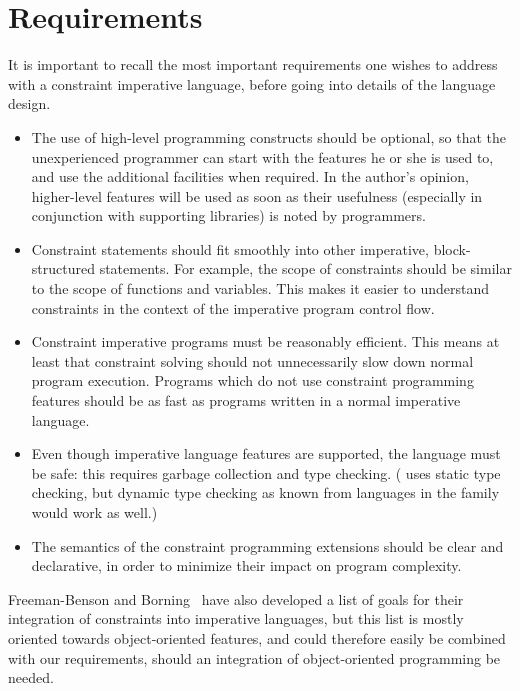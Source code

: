 \section{Requirements}
\label{sec:requirements}

It is important to recall the most important requirements one wishes
to address with a constraint imperative language, before going into
details of the language design.
%
\begin{itemize}
\item The use of high-level programming constructs should be optional,
  so that the unexperienced programmer can start with the features he
  or she is used to, and use the additional facilities when required.
  In the author's opinion, higher-level features will be used as soon
  as their usefulness (especially in conjunction with supporting
  libraries) is noted by programmers.

\item Constraint statements should fit smoothly into other imperative,
  block-structured statements.  For example, the scope of constraints
  should be similar to the scope of functions and variables.  This
  makes it easier to understand constraints in the context of the
  imperative program control flow.
  
\item Constraint imperative programs must be reasonably efficient.
  This means at least that constraint solving should not unnecessarily
  slow down normal program execution.  Programs which do not use
  constraint programming features should be as fast as programs
  written in a normal imperative language.
  
\item Even though imperative language features are supported, the
  language must be safe: this requires garbage collection and type
  checking. (\turtle{} uses static type checking, but dynamic type
  checking as known from languages in the \lisp{} family would work as
  well.)
  
\item The semantics of the constraint programming extensions should be
  clear and declarative, in order to minimize their impact on program
  complexity.
\end{itemize}
%
Freeman-Benson and Borning~\cite{benson92int} have also developed a
list of goals for their integration of constraints into imperative
languages, but this list is mostly oriented towards object-oriented
features, and could therefore easily be combined with our
requirements, should an integration of object-oriented programming be
needed.

